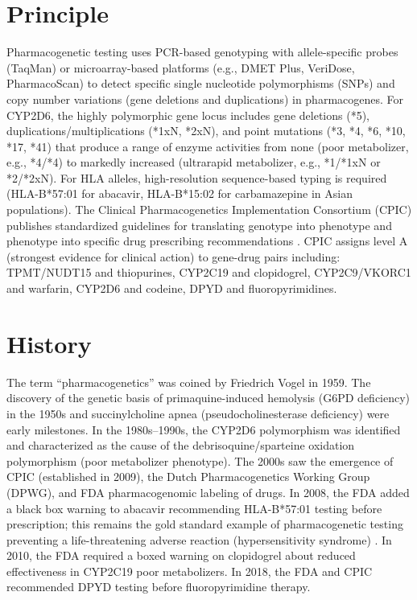 \section*{Principle}
Pharmacogenetic testing uses PCR-based genotyping with allele-specific probes (TaqMan) or microarray-based platforms (e.g., DMET Plus, VeriDose, PharmacoScan) to detect specific single nucleotide polymorphisms (SNPs) and copy number variations (gene deletions and duplications) in pharmacogenes. For CYP2D6, the highly polymorphic gene locus includes gene deletions (*5), duplications/multiplications (*1xN, *2xN), and point mutations (*3, *4, *6, *10, *17, *41) that produce a range of enzyme activities from none (poor metabolizer, e.g., *4/*4) to markedly increased (ultrarapid metabolizer, e.g., *1/*1xN or *2/*2xN). For HLA alleles, high-resolution sequence-based typing is required (HLA-B*57:01 for abacavir, HLA-B*15:02 for carbamazepine in Asian populations). The Clinical Pharmacogenetics Implementation Consortium (CPIC) publishes standardized guidelines for translating genotype into phenotype and phenotype into specific drug prescribing recommendations \cite{relling2020cpic}. CPIC assigns level A (strongest evidence for clinical action) to gene-drug pairs including: TPMT/NUDT15 and thiopurines, CYP2C19 and clopidogrel, CYP2C9/VKORC1 and warfarin, CYP2D6 and codeine, DPYD and fluoropyrimidines.

\section*{History}
The term ``pharmacogenetics'' was coined by Friedrich Vogel in 1959. The discovery of the genetic basis of primaquine-induced hemolysis (G6PD deficiency) in the 1950s and succinylcholine apnea (pseudocholinesterase deficiency) were early milestones. In the 1980s--1990s, the CYP2D6 polymorphism was identified and characterized as the cause of the debrisoquine/sparteine oxidation polymorphism (poor metabolizer phenotype). The 2000s saw the emergence of CPIC (established in 2009), the Dutch Pharmacogenetics Working Group (DPWG), and FDA pharmacogenomic labeling of drugs. In 2008, the FDA added a black box warning to abacavir recommending HLA-B*57:01 testing before prescription; this remains the gold standard example of pharmacogenetic testing preventing a life-threatening adverse reaction (hypersensitivity syndrome) \cite{mallal2008hlab5701}. In 2010, the FDA required a boxed warning on clopidogrel about reduced effectiveness in CYP2C19 poor metabolizers. In 2018, the FDA and CPIC recommended DPYD testing before fluoropyrimidine therapy.

